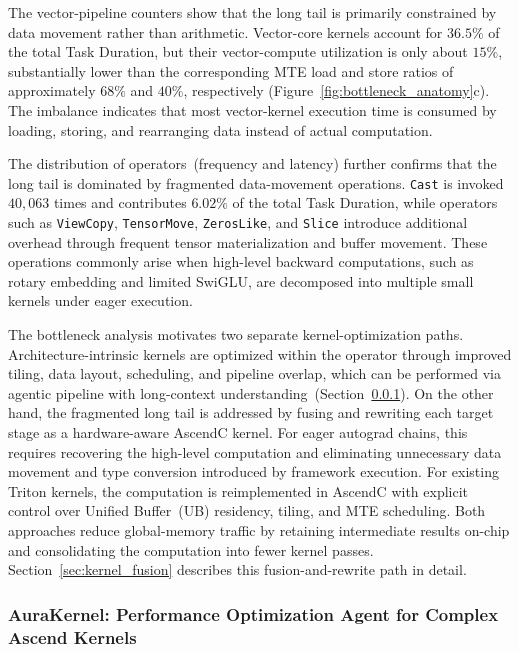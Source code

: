 The vector-pipeline counters show that the long tail is primarily constrained by data movement rather than arithmetic. Vector-core kernels account for $36.5\%$ of the total Task Duration, but their vector-compute utilization is only about $15\%$, substantially lower than the corresponding MTE load and store ratios of approximately $68\%$ and $40\%$, respectively (Figure~\ref{fig:bottleneck_anatomy}c). The imbalance indicates that most vector-kernel execution time is consumed by loading, storing, and rearranging data instead of actual computation.

The distribution of operators~(frequency and latency) further confirms that the long tail is dominated by fragmented data-movement operations. \texttt{Cast} is invoked $40{,}063$ times and contributes $6.02\%$ of the total Task Duration, while operators such as \texttt{ViewCopy}, \texttt{TensorMove}, \texttt{ZerosLike}, and \texttt{Slice} introduce additional overhead through frequent tensor materialization and buffer movement. These operations commonly arise when high-level backward computations, such as rotary embedding and limited SwiGLU, are decomposed into multiple small kernels under eager execution.

The bottleneck analysis motivates two separate kernel-optimization paths. Architecture-intrinsic kernels are optimized within the operator through improved tiling, data layout, scheduling, and pipeline overlap, which can be performed via agentic pipeline with long-context understanding~(Section~\ref{sec:kernel_agent}). On the other hand, the fragmented long tail is addressed by fusing and rewriting each target stage as a hardware-aware AscendC kernel. For eager autograd chains, this requires recovering the high-level computation and eliminating unnecessary data movement and type conversion introduced by framework execution. For existing Triton kernels, the computation is reimplemented in AscendC with explicit control over Unified Buffer~(UB) residency, tiling, and MTE scheduling. Both approaches reduce global-memory traffic by retaining intermediate results on-chip and consolidating the computation into fewer kernel passes. Section~\ref{sec:kernel_fusion} describes this fusion-and-rewrite path in detail.


\subsubsection{AuraKernel: Performance Optimization Agent for Complex Ascend Kernels}
\label{sec:kernel_agent}

